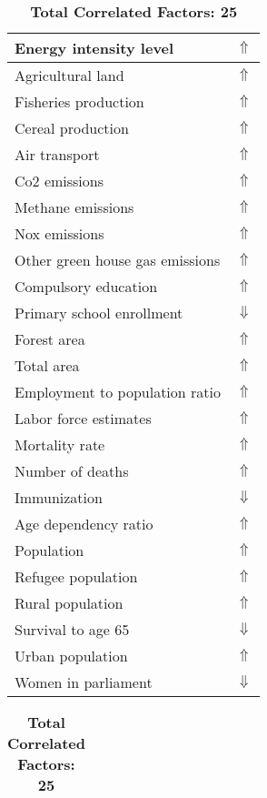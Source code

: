 \documentclass[12pt,notitlepage,oneside]{report}
\begin{document}
\begin{table}[!htb]
\caption{\textbf{Shows Symptom: Vomiting $\Uparrow$}}
\centering
\label{Correlated Socio-economic Factors0}
\begin{tabular}{|l|l|}
\hline
Energy intensity level & $\Uparrow$\\ \hline
Agricultural land & $\Uparrow$\\ \hline
Fisheries production & $\Uparrow$\\ \hline
Cereal production & $\Uparrow$\\ \hline
Air transport  & $\Uparrow$\\ \hline
Co2 emissions & $\Uparrow$\\ \hline
Methane emissions & $\Uparrow$\\ \hline
Nox emissions & $\Uparrow$\\ \hline
Other green house gas emissions & $\Uparrow$\\ \hline
Compulsory education & $\Uparrow$\\ \hline
Primary school enrollment & $\Downarrow$\\ \hline
Forest area & $\Uparrow$\\ \hline
Total area & $\Uparrow$\\ \hline
Employment to population ratio & $\Uparrow$\\ \hline
Labor force estimates & $\Uparrow$\\ \hline
Mortality rate & $\Uparrow$\\ \hline
Number of deaths & $\Uparrow$\\ \hline
Immunization & $\Downarrow$\\ \hline
Age dependency ratio & $\Uparrow$\\ \hline
Population & $\Uparrow$\\ \hline
Refugee population & $\Uparrow$\\ \hline
Rural population & $\Uparrow$\\ \hline
Survival to age 65 & $\Downarrow$\\ \hline
Urban population & $\Uparrow$\\ \hline
Women in parliament & $\Downarrow$\\ \hline
\end{tabular}
\begin{tabular}{|l|l|}
\hline
\end{tabular}
\caption*{\textbf{Total Correlated Factors: 25}}
\end{table}
\clearpage
\end{document}
